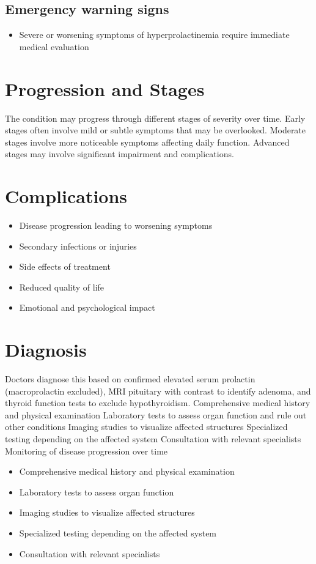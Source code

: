 \subsection{Emergency warning signs}
\begin{itemize}[noitemsep]
  \item Severe or worsening symptoms of hyperprolactinemia require immediate medical evaluation
\end{itemize}
\section{Progression and Stages}
The condition may progress through different stages of severity over time. Early stages often involve mild or subtle symptoms that may be overlooked. Moderate stages involve more noticeable symptoms affecting daily function. Advanced stages may involve significant impairment and complications.
\section{Complications}
\begin{itemize}[noitemsep]
  \item Disease progression leading to worsening symptoms
  \item Secondary infections or injuries
  \item Side effects of treatment
  \item Reduced quality of life
  \item Emotional and psychological impact
\end{itemize}
\section{Diagnosis}
Doctors diagnose this based on confirmed elevated serum prolactin (macroprolactin excluded), MRI pituitary with contrast to identify adenoma, and thyroid function tests to exclude hypothyroidism. Comprehensive medical history and physical examination Laboratory tests to assess organ function and rule out other conditions Imaging studies to visualize affected structures Specialized testing depending on the affected system Consultation with relevant specialists Monitoring of disease progression over time

\begin{itemize}[noitemsep]
  \item Comprehensive medical history and physical examination
  \item Laboratory tests to assess organ function
  \item Imaging studies to visualize affected structures
  \item Specialized testing depending on the affected system
  \item Consultation with relevant specialists
\end{itemize}
